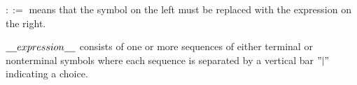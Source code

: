 \documentclass[a4paper,10pt]{article}
\begin{document}
\begin{terms}
\begin{terms}
        \item $::=$ means that the symbol on the left must be replaced with the expression on the right.

        \item $\underline{\hspace{4mm}}{}expression\underline{\hspace{4mm}}$  consists of one or more sequences of either terminal or nonterminal symbols where each sequence is separated by a vertical bar $"|"$ indicating a choice.
    \end{terms}

    
    
\end{terms}
\end{document}
